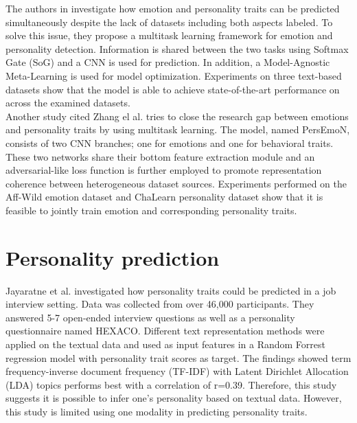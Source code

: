The authors in \cite{personality-emotion1-LI2022340} investigate how emotion and personality traits can be predicted simultaneously despite the lack of datasets including both aspects labeled. To solve this issue, they propose a multitask learning framework for emotion and personality detection. Information is shared between the two tasks using Softmax Gate (SoG) and a CNN is used for prediction. In addition, a Model-Agnostic Meta-Learning is used for model optimization. Experiments on three text-based datasets show that the model is able to achieve state-of-the-art performance on across the examined datasets. \\

Another study cited Zhang el al. \cite{personality-emotion2-8897617} tries to close the research gap between emotions and personality traits by using multitask learning. The model, named PersEmoN, consists of two CNN branches; one for emotions and one for behavioral traits. These two networks share their bottom feature extraction module and an adversarial-like loss function is further employed to promote representation coherence between heterogeneous dataset sources. Experiments performed on the Aff-Wild emotion dataset and ChaLearn personality dataset show that it is feasible to jointly train emotion and corresponding personality traits. 

\section{Personality prediction}
\label{sec:personality_prediction}
Jayaratne et al. \cite{personality-prediction-questions-9121971} investigated how personality traits could be predicted in a job interview setting. Data was collected from over 46,000 participants. They answered 5-7 open-ended interview questions as well as a personality questionnaire named HEXACO. Different text representation methods were applied on the textual data and used as input features in a Random Forrest regression model with personality trait scores as target. The findings showed term frequency-inverse document frequency (TF-IDF) with Latent Dirichlet Allocation (LDA) topics performs best with a correlation of r=0.39. Therefore, this study suggests it is possible to infer one's personality based on textual data. However, this study is limited using one modality in predicting personality traits.  \\ 

